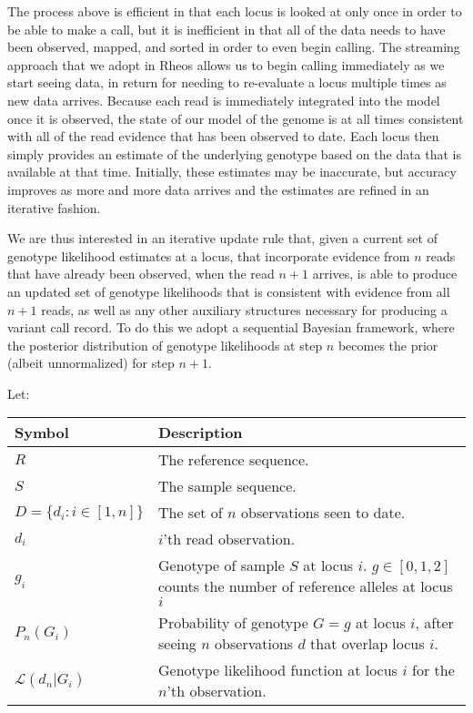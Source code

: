 The process above is efficient in that each locus is looked at only once in order to be able to make a call, but it is inefficient in that all of the data needs to have been observed, mapped, and sorted in order to even begin calling. The streaming approach that we adopt in Rheos allows us to begin calling immediately as we start seeing data, in return for needing to re-evaluate a locus multiple times as new data arrives. Because each read is immediately integrated into the model once it is observed, the state of our model of the genome is at all times consistent with all of the read evidence that has been observed to date. Each locus then simply provides an estimate of the underlying genotype based on the data that is available at that time. Initially, these estimates may be inaccurate, but accuracy improves as more and more data arrives and the estimates are refined in an iterative fashion.   

We are thus interested in an iterative update rule that, given a current set of genotype likelihood estimates at a locus, that incorporate evidence from $n$ reads that have already been observed, when the read $n+1$ arrives, is able to produce an updated set of genotype likelihoods that is consistent with evidence from all $n+1$ reads, as well as any other auxiliary structures necessary for producing a variant call record. To do this we adopt a sequential Bayesian framework, where the posterior distribution of genotype likelihoods at step $n$ becomes the prior (albeit unnormalized) for step $n+1$. 

Let:

\begin{table}[!h]
    \label{tab:snp_calling_notation}
    {\begin{tabular}{lp{11cm}}
    \toprule
    Symbol & Description \\
    \midrule
    $R$ & The reference sequence. \\
    $S$ & The sample sequence. \\
    $D = \{d_i: i \in [1,n]\}$ & The set of $n$ observations seen to date. \\ 
    $d_i$ & $i$'th read observation. \\
    $g_{i}$ & Genotype of sample $S$ at locus $i$. $g \in [0,1,2]$ counts the number of reference alleles at locus $i$\\
    $P_n(G_i)$ & Probability of genotype $G = g$ at locus $i$, after seeing $n$ observations $d$ that overlap locus $i$.\\
    $\mathcal{L}(d_n|G_i)$ & Genotype likelihood function at locus $i$ for the $n$'th observation.\\
    \bottomrule
    \end{tabular}}
\end{table}

